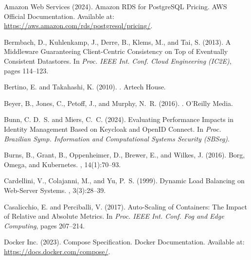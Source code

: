 \documentclass[a4paper,twoside]{article}
\begin{document}

\begin{thebibliography}{}

Amazon Web Services (2024).
\newblock Amazon RDS for PostgreSQL Pricing.
\newblock AWS Official Documentation.
\newblock Available at: \url{https://aws.amazon.com/rds/postgresql/pricing/}.

Bermbach, D., Kuhlenkamp, J., Derre, B., Klems, M., and Tai, S. (2013).
\newblock A Middleware Guaranteeing Client-Centric Consistency on Top of Eventually Consistent Datastores.
\newblock In {\em Proc. IEEE Int. Conf. Cloud Engineering (IC2E)}, pages 114--123.

Bertino, E. and Takahashi, K. (2010).
.
\newblock Artech House.

Beyer, B., Jones, C., Petoff, J., and Murphy, N.~R. (2016).
.
\newblock O'Reilly Media.

Bunn, C. D.~S. and Miers, C.~C. (2024).
\newblock Evaluating Performance Impacts in Identity Management Based on Keycloak and OpenID Connect.
\newblock In {\em Proc. Brazilian Symp. Information and Computational Systems Security (SBSeg)}.

Burns, B., Grant, B., Oppenheimer, D., Brewer, E., and Wilkes, J. (2016).
\newblock Borg, Omega, and Kubernetes.
, 14(1):70--93.

Cardellini, V., Colajanni, M., and Yu, P.~S. (1999).
\newblock Dynamic Load Balancing on Web-Server Systems.
, 3(3):28--39.

Casalicchio, E. and Perciballi, V. (2017).
\newblock Auto-Scaling of Containers: The Impact of Relative and Absolute Metrics.
\newblock In {\em Proc. IEEE Int. Conf. Fog and Edge Computing}, pages 207--214.

Docker Inc. (2023).
\newblock Compose Specification.
\newblock Docker Documentation.
\newblock Available at: \url{https://docs.docker.com/compose/}.


\end{thebibliography}
\end{document}
